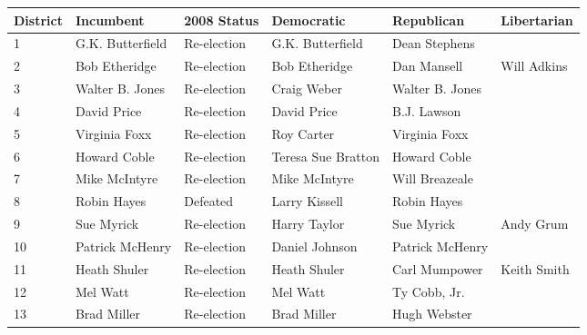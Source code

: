 \documentclass{article}
\begin{document}
\begin{tabular}{llllll}
\toprule
District & Incumbent & 2008 Status & Democratic & Republican & Libertarian \\
\midrule
1 & G.K. Butterfield & Re-election & G.K. Butterfield & Dean Stephens &  \\
2 & Bob Etheridge & Re-election & Bob Etheridge & Dan Mansell & Will Adkins \\
3 & Walter B. Jones & Re-election & Craig Weber & Walter B. Jones &  \\
4 & David Price & Re-election & David Price & B.J. Lawson &  \\
5 & Virginia Foxx & Re-election & Roy Carter & Virginia Foxx &  \\
6 & Howard Coble & Re-election & Teresa Sue Bratton & Howard Coble &  \\
7 & Mike McIntyre & Re-election & Mike McIntyre & Will Breazeale &  \\
8 & Robin Hayes & Defeated & Larry Kissell & Robin Hayes &  \\
9 & Sue Myrick & Re-election & Harry Taylor & Sue Myrick & Andy Grum \\
10 & Patrick McHenry & Re-election & Daniel Johnson & Patrick McHenry &  \\
11 & Heath Shuler & Re-election & Heath Shuler & Carl Mumpower & Keith Smith \\
12 & Mel Watt & Re-election & Mel Watt & Ty Cobb, Jr. &  \\
13 & Brad Miller & Re-election & Brad Miller & Hugh Webster &  \\
\bottomrule
\end{tabular}
\end{document}
